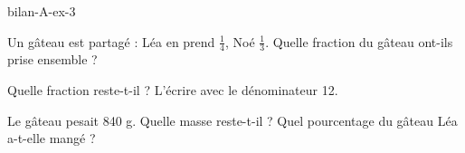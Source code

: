 \begin{blocEdition}{bilan-A-ex-3}
\begin{questions}
\item Un gâteau est partagé : Léa en prend $\frac14$, Noé $\frac13$. Quelle fraction du gâteau ont-ils prise ensemble ?
\item Quelle fraction reste-t-il ? L’écrire avec le dénominateur 12.
\item Le gâteau pesait 840 g. Quelle masse reste-t-il ? Quel pourcentage du gâteau Léa a-t-elle mangé ?
\end{questions}\par{}\par\par{}\par{}\par{}\par{}\par{}\par{}
\end{blocEdition}
